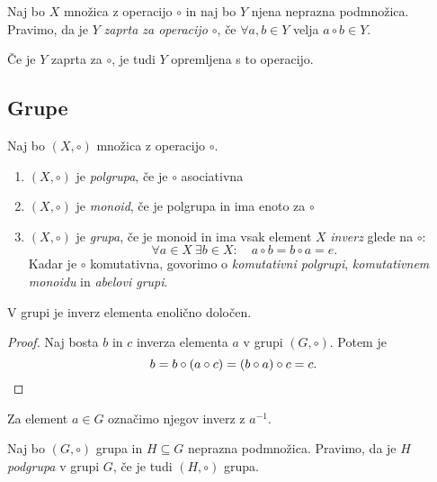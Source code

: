 \documentclass[12pt, a4paper]{article}
\begin{document}
\begin{definicija}
Naj bo $X$ množica z operacijo $\circ$ in naj bo $Y$ njena neprazna podmnožica. Pravimo, da je $Y$ \emph{zaprta za operacijo $\circ$}, če $\forall a,b\in Y$ velja $a\circ b\in Y$.
\end{definicija}
\begin{opomba}
Če je $Y$ zaprta za $\circ$, je tudi $Y$ opremljena s to operacijo.
\end{opomba}

\newpage

\subsection{Grupe}

\begin{okvir}
\begin{definicija}
Naj bo $(X,\circ)$ množica z operacijo $\circ$.

\begin{enumerate}[label=\alph*)]
\item $(X,\circ)$ je \emph{polgrupa}, če je $\circ$ asociativna
\item $(X,\circ)$ je \emph{monoid}, če je polgrupa in ima enoto za $\circ$
\item $(X,\circ)$ je \emph{grupa}, če je monoid in ima vsak element $X$ \emph{inverz} glede na $\circ$:
\[
\forall a\in X~\exists b\in X\colon \quad a\circ b=b\circ a=e.
\]
Kadar je $\circ$ komutativna, govorimo o \emph{komutativni polgrupi}, \emph{komutativnem monoidu} in \emph{abelovi grupi}.
\end{enumerate}
\end{definicija}
\end{okvir}

\begin{trditev}
V grupi je inverz elementa enolično določen.
\end{trditev}

\begin{proof}
Naj bosta $b$ in $c$ inverza elementa $a$ v grupi $(G,\circ)$. Potem je
\[
b=b\circ (a\circ c)=(b\circ a)\circ c=c.\qedhere
\]
\end{proof}

Za element $a\in G$ označimo njegov inverz z $a^{-1}$.

\begin{definicija}
Naj bo $(G,\circ)$ grupa in $H\subseteq G$ neprazna podmnožica. Pravimo, da je $H$ \emph{podgrupa} v grupi $G$, če je tudi $(H,\circ)$ grupa.
\end{definicija}
\end{document}
